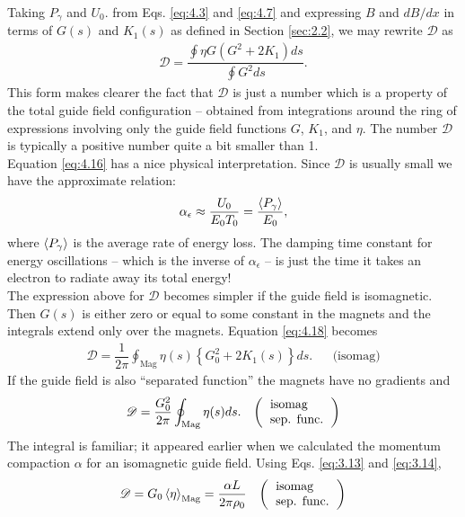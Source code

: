\documentclass[../sands-adaptation.tex]{subfiles}
\begin{document}
Taking $P_\gamma$ and $U_0$. from Eqs. \eqref{eq:4.3} and \eqref{eq:4.7} and expressing
 $B$ and $dB/dx$ in terms of $G(s)$ and $K_1(s)$ as defined in Section \ref{sec:2.2}, we may rewrite $\mathscr{D}$ as
\begin{align} \label{eq:4.18}
	\mathscr{D} = \dfrac{\oint \eta G (G^2 + 2K_1)ds}{\oint G^2 ds}.
\end{align}
This form makes clearer the fact that $\mathscr{D}$ is just a number which is a property of
the total guide field configuration -- obtained from integrations around the ring of expressions
 involving only the guide field functions $G$, $K_1$, and $\eta$. The number $\mathscr{D}$ is typically a positive number quite a bit smaller than 1.\\
Equation \eqref{eq:4.16} has a nice physical interpretation. Since $\mathscr{D}$ is usually small
we have the approximate relation:
\begin{align}\label{eq:4.alfa_epsilon}
	\alpha_\epsilon \approx \dfrac{U_0}{E_0 T_0} = \dfrac{\left< P_\gamma \right>}{E_0},
\end{align}
where $\left< P_\gamma \right>$ is the average rate of energy loss. The damping time constant for energy oscillations -- which is the inverse of $\alpha_\epsilon$ -- is just the time it takes an electron to radiate away its total energy!\\
The expression above for $\mathscr{D}$ becomes simpler if the guide field is isomagnetic. Then $G(s)$ is either zero or equal to some constant in the magnets and the integrals extend only over the magnets. Equation \eqref{eq:4.18} becomes
\begin{align} \label{eq:4.20}
	\mathscr{D} = \dfrac{1}{2\pi}\oint_{\text{Mag}}\eta(s)\left\lbrace G_0^2 + 2K_1(s) \right\rbrace ds. && \text{(isomag)}
\end{align}
If the guide field is also ``separated function'' the magnets have no gradients and
\begin{align}\label{eq:4.17}
	\mathscr{D} = \dfrac{G_0^2}{2\pi}\oint_{\text{Mag}}\eta(s) ds. && \left(\begin{tabular}{l}
\text{isomag} \\
\text{sep. func.}
\end{tabular}\right)
\end{align}
The integral is familiar; it appeared earlier when we calculated the momentum compaction $\alpha$ for an isomagnetic guide field. Using Eqs. \eqref{eq:3.13} and \eqref{eq:3.14},
\begin{align}
	\mathscr{D} = G_0 \mean{\eta}_\text{Mag} = \dfrac{\alpha L}{2 \pi \rho_0} && \left(\begin{tabular}{l}
\text{isomag} \\
\text{sep. func.}
\end{tabular}\right)
\end{align}
\end{document}
